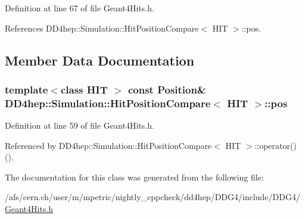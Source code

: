 Definition at line 67 of file Geant4Hits.h.

References DD4hep::Simulation::HitPositionCompare$<$ HIT $>$::pos.

\subsection{Member Data Documentation}
\hypertarget{struct_d_d4hep_1_1_simulation_1_1_hit_position_compare_a7518eb9e68d39b52d5974d90ddaad47d}{
\subsubsection[{pos}]{\setlength{\rightskip}{0pt plus 5cm}template$<$class HIT $>$ const {\bf Position}\& {\bf DD4hep::Simulation::HitPositionCompare}$<$ HIT $>$::{\bf pos}}}
\label{struct_d_d4hep_1_1_simulation_1_1_hit_position_compare_a7518eb9e68d39b52d5974d90ddaad47d}


Definition at line 59 of file Geant4Hits.h.

Referenced by DD4hep::Simulation::HitPositionCompare$<$ HIT $>$::operator()().

The documentation for this class was generated from the following file:\begin{DoxyCompactItemize}
\item 
/afs/cern.ch/user/m/mpetric/nightly\_\-cppcheck/dd4hep/DDG4/include/DDG4/\hyperlink{_geant4_hits_8h}{Geant4Hits.h}\end{DoxyCompactItemize}
